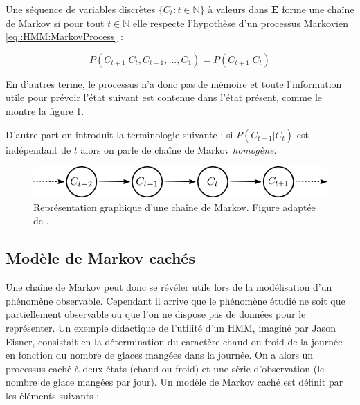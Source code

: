 \documentclass[12pt]{report}
\begin{document}

Une séquence de variables discrètes $\{ C_t : t \in \mathbb{N} \}$ à valeurs dans $\bm{E}$ forme une chaîne de Markov si pour tout $t \in \mathbb{N}$ elle respecte l'hypothèse d'un processus Markovien \eqref{eq::HMM:MarkovProcess} :

\begin{equation}
P\left( C_{t+1} | C_t,C_{t-1},...,C_1  \right) = P\left( C_{t+1} | C_t  \right)
\label{eq::HMM:MarkovProcess}
\end{equation}

En d'autres terme, le processus n'a donc pas de mémoire et toute l'information utile pour prévoir l'état suivant est contenue dans l'état présent, comme le montre la figure \ref{fig::HMM:MarkovChain}.

D'autre part on introduit la terminologie suivante : si $P\left( C_{t+1} | C_t  \right)$ est indépendant de $t$ alors on parle de chaîne de Markov \textit{homogène}.

\begin{figure}[ht]
	\begin{center}
		\includegraphics[width= 0.6 \textwidth]{Images/Models/HMM/ChaineMarkov.png}
		\caption{Représentation graphique d'une chaîne de Markov. Figure adaptée de \cite{zucchini_hidden_2017}.}
		\label{fig::HMM:MarkovChain}
	\end{center}
\end{figure}

\subsection{Modèle de Markov cachés}
\label{subsec:Modeles_HMM}
Une chaîne de Markov peut donc se révéler utile lors de la modélisation d'un phénomène observable. Cependant il arrive que le phénomène étudié ne soit que partiellement observable ou que l'on ne dispose pas de données pour le représenter. Un exemple didactique de l'utilité d'un HMM, imaginé par Jason Eisner, consistait en la détermination du caractère chaud ou froid de la journée en fonction du nombre de glaces mangées dans la journée. On a alors un processus caché à deux états (chaud ou froid) et une série d'observation (le nombre de glace mangées par jour). Un modèle de Markov caché est définit par les éléments suivants :
\end{document}
